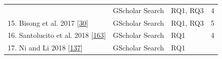 \documentclass[]{book}
\begin{document}
\begin{longtable}[]{@{}llll@{}}
\begin{minipage}[t]{0.48\columnwidth}
\end{minipage} & \begin{minipage}[t]{0.20\columnwidth}\raggedright\strut
GScholar Search\strut
\end{minipage} & \begin{minipage}[t]{0.14\columnwidth}\raggedright\strut
RQ1, RQ3\strut
\end{minipage} & \begin{minipage}[t]{0.06\columnwidth}\raggedright\strut
4\strut
\end{minipage}\tabularnewline
\begin{minipage}[t]{0.48\columnwidth}\raggedright\strut
15. Bisong et al. 2017
{[}\protect\hyperlink{ref-bisong2017built}{30}{]}\strut
\end{minipage} & \begin{minipage}[t]{0.20\columnwidth}\raggedright\strut
GScholar Search\strut
\end{minipage} & \begin{minipage}[t]{0.14\columnwidth}\raggedright\strut
RQ1, RQ3\strut
\end{minipage} & \begin{minipage}[t]{0.06\columnwidth}\raggedright\strut
5\strut
\end{minipage}\tabularnewline
\begin{minipage}[t]{0.48\columnwidth}\raggedright\strut
16. Santolucito et al. 2018
{[}\protect\hyperlink{ref-santolucito2018statically}{163}{]}\strut
\end{minipage} & \begin{minipage}[t]{0.20\columnwidth}\raggedright\strut
GScholar Search\strut
\end{minipage} & \begin{minipage}[t]{0.14\columnwidth}\raggedright\strut
RQ1\strut
\end{minipage} & \begin{minipage}[t]{0.06\columnwidth}\raggedright\strut
4\strut
\end{minipage}\tabularnewline
\begin{minipage}[t]{0.48\columnwidth}\raggedright\strut
17. Ni and Li 2018 {[}\protect\hyperlink{ref-ni2018acona}{137}{]}\strut
\end{minipage} & \begin{minipage}[t]{0.20\columnwidth}\raggedright\strut
GScholar Search\strut
\end{minipage} & \begin{minipage}[t]{0.14\columnwidth}\raggedright\strut
RQ1\strut
\end{minipage} & \begin{minipage}[t]{0.06\columnwidth}\raggedright\strut

\end{minipage}
\end{longtable}
\end{document}
